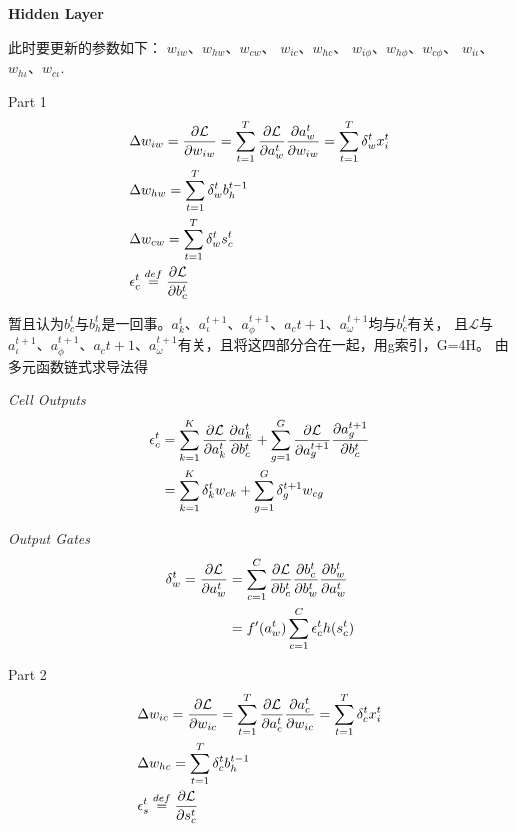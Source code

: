 \documentclass[UTF8]{article}
\begin{document}
        \textbf{Hidden Layer}

        此时要更新的参数如下：
        $w_{iw}$、$w_{hw}$、$w_{cw}$、
        $w_{ic}$、$w_{hc}$、
        $w_{i\phi}$、$w_{h\phi}$、$w_{c\phi}$、
        $w_{i\iota}$、$w_{h\iota}$、$w_{c\iota}$.

        Part 1
        \begin{align}
        & \Delta w_{iw} = \frac{\partial \mathcal{L}}{\partial w_{iw}}
        = \sum_{t=1}^T \frac{\partial \mathcal{L}}{\partial a_w^t}\frac{\partial a_w^t}{\partial w_{iw}}
        = \sum_{t=1}^T \delta_w^t x_i^t \notag \\
        & \Delta w_{hw} = \sum_{t=1}^T \delta_w^t b_h^{t-1} \notag \\
        & \Delta w_{cw} = \sum_{t=1}^T \delta_w^t s_c^t \notag \\
        & \epsilon_c^t\stackrel{def}{=} \frac{\partial \mathcal{L}}{\partial b_c^t} \notag
        \end{align}

        暂且认为$b_c^t$与$b_h^t$是一回事。$a_k^t$、$a_\iota^{t+1}$、$a_\phi^{t+1}$、$a_c{t+1}$、$a_\omega^{t+1}$均与$b_c^t$有关，
        且$\mathcal{L}$与$a_\iota^{t+1}$、$a_\phi^{t+1}$、$a_c{t+1}$、$a_\omega^{t+1}$有关，且将这四部分合在一起，用g索引，G=4H。
        由多元函数链式求导法得
        
        \emph{Cell Outputs}
        \begin{align}
        \epsilon_c^t &= \sum_{k=1}^K \frac{\partial \mathcal{L}}{\partial a_k^t} \frac{\partial a_k^t}{\partial b_c^t}
        + \sum_{g=1}^G \frac{\partial \mathcal{L}}{\partial a_g^{t+1}} \frac{\partial a_g^{t+1}}{\partial b_c^t} \notag \\
        &= \sum_{k=1}^K \delta_k^t w_{ck} + \sum_{g=1}^G \delta_g^{t+1} w_{cg}
        \end{align}

        \emph{Output Gates}
        \begin{align}
        \delta_w^t = \frac{\partial \mathcal{L}}{\partial a_w^t}
        &= \sum_{c=1}^C \frac{\partial \mathcal{L}}{\partial b_c^t} \frac{\partial b_c^t}{\partial b_w^t} \frac{\partial b_w^t}{\partial a_w^t} \notag \\
        &= f'(a_w^t)\sum_{c=1}^C \epsilon_c^t h(s_c^t)
        \end{align}

        Part 2
        \begin{align}
        & \Delta w_{ic} = \frac{\partial \mathcal{L}}{\partial w_{ic}}
        = \sum_{t=1}^T \frac{\partial \mathcal{L}}{\partial a_c^t}\frac{\partial a_c^t}{\partial w_{ic}}
        = \sum_{t=1}^T \delta_c^t x_i^t \notag \\
        & \Delta w_{hc} = \sum_{t=1}^T \delta_c^t b_h^{t-1} \notag \\
        & \epsilon_s^t\stackrel{def}{=} \frac{\partial \mathcal{L}}{\partial s_c^t} \notag
        \end{align}
        
\end{document}

